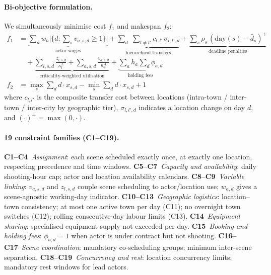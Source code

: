 \paragraph{Bi-objective formulation.}
We simultaneously minimise cost $f_1$ and makespan $f_2$:
\begin{align}
f_1 &= \underbrace{\sum_{a} w_a \bigl|\{d : \sum\nolimits_{s} v_{a,s,d} \geq 1\}\bigr|}_{\text{actor wages}}
     + \underbrace{\sum_{d}\;\sum_{l \neq l'} c_{l,l'}\,\sigma_{l,l',d}}_{\text{hierarchical transfers}}
     + \underbrace{\sum_{s} \rho_s\,(\mathrm{day}(s) - \bar{d}_s)^{+}}_{\text{deadline penalties}}
     \nonumber \\
    &\quad
     + \underbrace{\sum_{l,s,d} \frac{z_{l,s,d}}{\kappa^{L}_{l}}
                 + \sum_{a,s,d} \frac{v_{a,s,d}}{\kappa^{A}_{a}}}_{\text{criticality-weighted utilisation}}
     + \underbrace{\sum_{a} h_a \sum_{d} \phi_{a,d}}_{\text{holding fees}}
     \label{eq:cost}\\[4pt]
f_2 &= \max_{s} \sum_{d} d \cdot x_{s,d}
     - \min_{s} \sum_{d} d \cdot x_{s,d} + 1
     \label{eq:makespan}
\end{align}
where $c_{l,l'}$ is the composite transfer cost between locations (intra-town / inter-town / inter-city by geographic tier), $\sigma_{l,l',d}$ indicates a location change on day $d$, and $(\cdot)^{+} = \max(0,\cdot)$.

\paragraph{19 constraint families (C1--C19).}
\textbf{C1--C4}~\emph{Assignment}: each scene scheduled exactly once, at exactly one location, respecting precedence and time windows.
\textbf{C5--C7}~\emph{Capacity and availability}: daily shooting-hour cap; actor and location availability calendars.
\textbf{C8--C9}~\emph{Variable linking}: $v_{a,s,d}$ and $z_{l,s,d}$ couple scene scheduling to actor/location use; $w_{a,d}$ gives a scene-agnostic working-day indicator.
\textbf{C10--C13}~\emph{Geographic logistics}: location--town consistency; at most one active town per day (C11); no overnight town switches (C12); rolling consecutive-day labour limits (C13).
\textbf{C14}~\emph{Equipment sharing}: specialised equipment supply not exceeded per day.
\textbf{C15}~\emph{Booking and holding fees}: $\phi_{a,d}=1$ when actor is under contract but not shooting.
\textbf{C16--C17}~\emph{Scene coordination}: mandatory co-scheduling groups; minimum inter-scene separation.
\textbf{C18--C19}~\emph{Concurrency and rest}: location concurrency limits; mandatory rest windows for lead actors.


